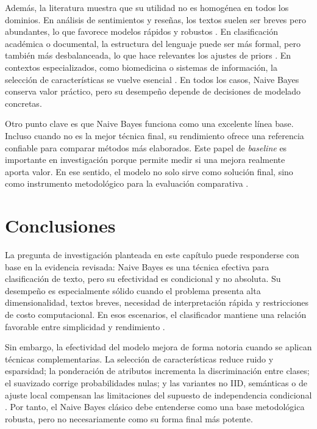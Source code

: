 Además, la literatura muestra que su utilidad no es homogénea en todos los dominios. En análisis de sentimientos y reseñas, los textos suelen ser breves pero abundantes, lo que favorece modelos rápidos y robustos \cite{Pratmanto2020,Musleh2023,Risal202335}. En clasificación académica o documental, la estructura del lenguaje puede ser más formal, pero también más desbalanceada, lo que hace relevantes los ajustes de priors \cite{Frank2006,Wang2007,Mendoza2011251}. En contextos especializados, como biomedicina o sistemas de información, la selección de características se vuelve esencial \cite{Han20062136,Humaidi2023}. En todos los casos, Naive Bayes conserva valor práctico, pero su desempeño depende de decisiones de modelado concretas.

Otro punto clave es que Naive Bayes funciona como una excelente línea base. Incluso cuando no es la mejor técnica final, su rendimiento ofrece una referencia confiable para comparar métodos más elaborados. Este papel de \textit{baseline} es importante en investigación porque permite medir si una mejora realmente aporta valor. En ese sentido, el modelo no solo sirve como solución final, sino como instrumento metodológico para la evaluación comparativa \cite{10.1145/2911451.2911547,Tang20162508,ELHINDI2020106652}.

\section{Conclusiones}

La pregunta de investigación planteada en este capítulo puede responderse con base en la evidencia revisada: Naive Bayes es una técnica efectiva para clasificación de texto, pero su efectividad es condicional y no absoluta. Su desempeño es especialmente sólido cuando el problema presenta alta dimensionalidad, textos breves, necesidad de interpretación rápida y restricciones de costo computacional. En esos escenarios, el clasificador mantiene una relación favorable entre simplicidad y rendimiento \cite{Kim2006,Frank2006,Sangounpao2019,Awotunde2023131,Pratmanto2020}.

Sin embargo, la efectividad del modelo mejora de forma notoria cuando se aplican técnicas complementarias. La selección de características reduce ruido y esparsidad; la ponderación de atributos incrementa la discriminación entre clases; el suavizado corrige probabilidades nulas; y las variantes no IID, semánticas o de ajuste local compensan las limitaciones del supuesto de independencia condicional \cite{CHEN20095432,YOUN2009477,Jiang2016,ZHANG2016137,FENG2015109,Ganiz20111022,Gan2021,ELHINDI2020106652}. Por tanto, el Naive Bayes clásico debe entenderse como una base metodológica robusta, pero no necesariamente como su forma final más potente.

